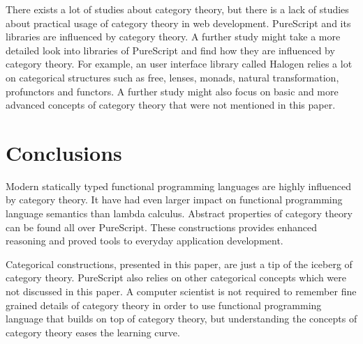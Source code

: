 \documentclass[article]{aaltoseries}
\begin{document}
There exists a lot of studies about category theory, but there is a lack of
studies about practical usage of category theory in web development. PureScript
and its libraries are influenced by category theory. A further study might take
a more detailed look into libraries of PureScript and find how they are
influenced by category theory. For example, an user interface library called
Halogen relies a lot on categorical structures such as free, lenses, monads,
natural transformation, profunctors and functors. A further study might also
focus on basic and more advanced concepts of category theory that were not
mentioned in this paper.



\section{Conclusions}

Modern statically typed functional programming languages are highly influenced
by category theory. It have had even larger impact on functional programming
language semantics than lambda calculus. Abstract properties of category theory
can be found all over PureScript. These constructions provides enhanced
reasoning and proved tools to everyday application development.
 
Categorical constructions, presented in this paper, are just a tip of the
iceberg of category theory. PureScript also relies on other categorical concepts
which were not discussed in this paper. A computer scientist is not required to
remember fine grained details of category theory in order to use functional
programming language that builds on top of category theory, but understanding
the concepts of category theory eases the learning curve.




\end{document}
